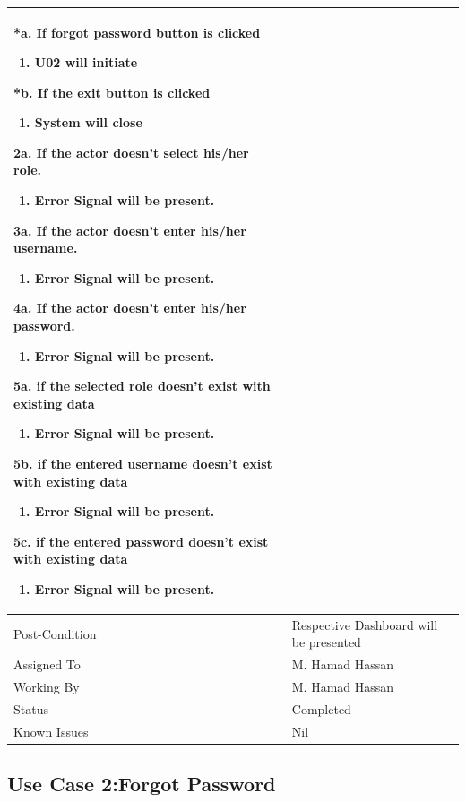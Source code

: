 \documentclass[12pt,a4paper]{article}
\begin{document}
\begin{longtable}{| p{3cm}|p{12cm}|}
 *a. If forgot password button is clicked 
 \begin{enumerate}
		\item U02 will initiate
	\end{enumerate}
 *b. If the exit button is clicked
	\begin{enumerate}
		\item System will close
	\end{enumerate}
 2a. If the actor doesn't select his/her role.
 	\begin{enumerate}
		\item Error Signal will be present.
	\end{enumerate}
3a. If the actor doesn't enter his/her username.
 	\begin{enumerate}
		\item Error Signal will be present.
	\end{enumerate}
4a. If the actor doesn't enter his/her password.
 	\begin{enumerate}
		\item Error Signal will be present.
	\end{enumerate}
5a. if the selected role doesn't exist with existing data
	\begin{enumerate}
		\item Error Signal will be present.
	\end{enumerate}
5b. if the entered username doesn't exist with existing data
	\begin{enumerate}
		\item Error Signal will be present.
	\end{enumerate}
5c. if the entered password doesn't exist with existing data
	\begin{enumerate}
		\item Error Signal will be present.
	\end{enumerate}
	
\\ \hline
Post-Condition & Respective Dashboard will be presented   
\\ \hline
Assigned To &  M. Hamad Hassan
\\ \hline
Working By &    M. Hamad Hassan
\\ \hline
Status & 	Completed	
\\ \hline
Known Issues & Nil
\\\hline
\end{longtable}
\subsection{Use Case 2:Forgot Password}
\end{document}
